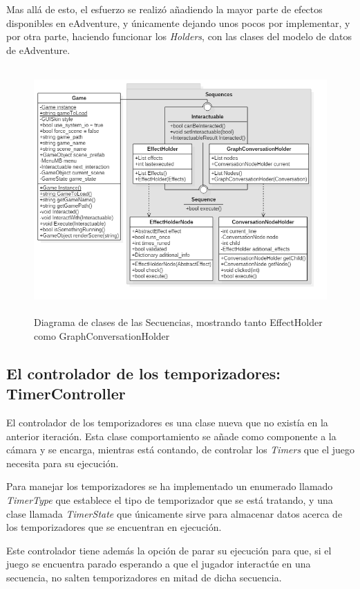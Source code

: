 Mas allá de esto, el esfuerzo se realizó añadiendo la mayor parte de efectos disponibles en eAdventure, y únicamente dejando unos pocos por implementar, y por otra parte, haciendo funcionar los \textit{Holders}, con las clases del modelo de datos de eAdventure.

\begin{figure}[h!]
	\centerline{\includegraphics[height=3.7in]{figures/it2/Sequences.png}}
	\caption[Sequences - Versión Final]{Diagrama de clases de las Secuencias, mostrando tanto EffectHolder como GraphConversationHolder}
	\label{sequencesfigit2}
\end{figure}

\subsection{El controlador de los temporizadores: TimerController}
\label{timercontrollersecit2}

El controlador de los temporizadores es una clase nueva que no existía en la anterior iteración. Esta clase comportamiento se añade como componente a la cámara y se encarga, mientras está contando, de controlar los \textit{Timers} que el juego necesita para su ejecución.

Para manejar los temporizadores se ha implementado un enumerado llamado \textit{TimerType} que establece el tipo de temporizador que se está tratando, y una clase llamada \textit{TimerState} que únicamente sirve para almacenar datos acerca de los temporizadores que se encuentran en ejecución.

Este controlador tiene además la opción de parar su ejecución para que, si el juego se encuentra parado esperando a que el jugador interactúe en una secuencia, no salten temporizadores en mitad de dicha secuencia. 

